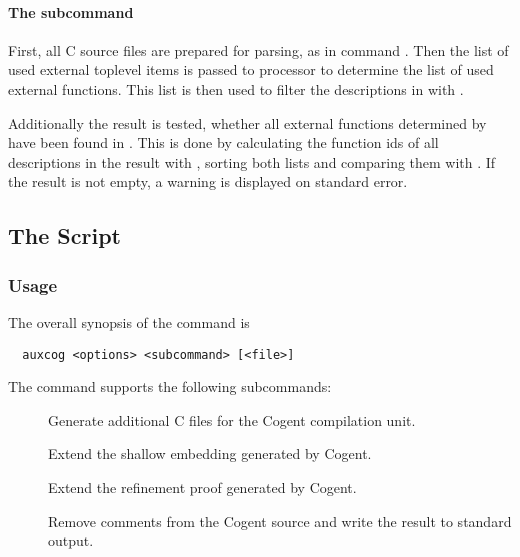 \paragraph{The subcommand } 
First, all C source files are prepared for parsing, as in command . Then the list of used external toplevel 
items  is passed to processor  to determine the list of 
used external functions. This list is then used to filter the descriptions in  with .

Additionally the result is tested, whether all external functions determined by  have been found in 
. This is done by calculating the function ids of all descriptions in the result with , 
sorting both lists and comparing them with . If the result is not empty, a warning is displayed on standard error.

\subsection{The  Script}
\label{impl-all-auxcog}

\subsubsection{Usage}

The overall synopsis of the  command is
\begin{verbatim}
  auxcog <options> <subcommand> [<file>]
\end{verbatim}

The  command supports the following subcommands:
\begin{description}
\item[] Generate additional C files for the Cogent compilation unit.

\item[] Extend the shallow embedding generated by Cogent.

\item[] Extend the refinement proof generated by Cogent.

\item[] Remove comments from the Cogent source  and write the result to standard output.

\end{description}

